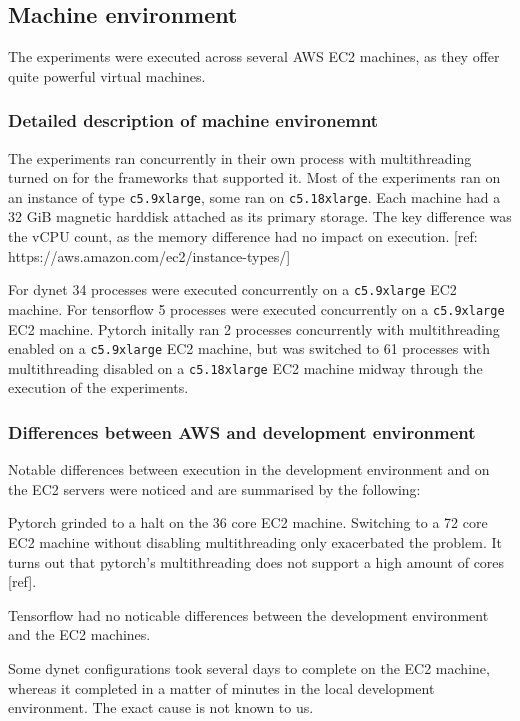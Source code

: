\subsection{Machine environment}

The experiments were executed across several AWS EC2 machines, as they offer
quite powerful virtual machines.

\subsubsection{Detailed description of machine environemnt}

The experiments ran concurrently in their own process with multithreading
turned on for the frameworks that supported it. Most of the experiments ran on
an instance of type \texttt{c5.9xlarge}, some ran on \texttt{c5.18xlarge}.
Each machine had a 32 GiB magnetic harddisk attached as its primary storage.
The key difference was the vCPU count, as the memory difference had no
impact on execution.
[ref: https://aws.amazon.com/ec2/instance-types/]

For dynet 34 processes were executed concurrently on a \texttt{c5.9xlarge} EC2
machine.
For tensorflow 5 processes were executed concurrently on a \texttt{c5.9xlarge}
EC2 machine.
Pytorch initally ran 2 processes concurrently with multithreading enabled on a
\texttt{c5.9xlarge} EC2 machine, but was switched to 61 processes with
multithreading disabled on a \texttt{c5.18xlarge} EC2 machine midway through the
execution of the experiments.

\subsubsection{Differences between AWS and development environment}

Notable differences between execution in the development environment and on the
EC2 servers were noticed and are summarised by the following:

Pytorch grinded to a halt on the 36 core EC2 machine. Switching to a 72 core EC2
machine without disabling multithreading only exacerbated the problem. It turns
out that pytorch's multithreading does not support a high amount of cores [ref].

Tensorflow had no noticable differences between the development environment and
the EC2 machines.

Some dynet configurations took several days to complete on the EC2 machine,
whereas it completed in a matter of minutes in the local development
environment. The exact cause is not known to us. 

